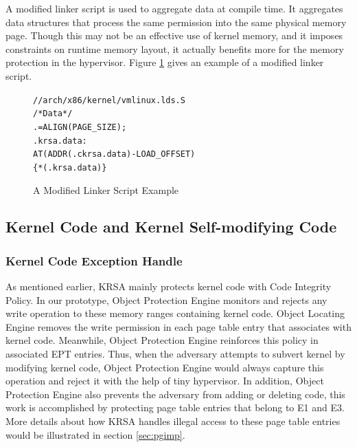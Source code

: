 \documentclass[conference]{IEEEtran}
\begin{document}
A modified linker script is used to aggregate data at compile time. It aggregates data structures that process the same permission into the same physical memory page. Though this may not be an effective use of kernel memory, and it imposes constraints on runtime memory layout, it actually benefits more for the memory protection in the hypervisor. Figure \ref{linkerexample} gives an example of a modified linker script. 
\begin{figure}[ht]
    \centering
    \begin{alltt}
    {// arch/x86/kernel/vmlinux.lds.S
    /* Data */
    . = ALIGN(PAGE_SIZE);
    .krsa.data : 
    AT(ADDR(.ckrsa.data) - LOAD_OFFSET)
    \{ *(.krsa.data) \} } \end{alltt}
\setlength{\abovecaptionskip}{0pt}
\setlength{\belowcaptionskip}{0pt}
\caption{A Modified Linker Script Example}
\label{linkerexample}
\end{figure}


\subsection{Kernel Code and Kernel Self-modifying Code} \label{sec:codeimp}

\subsubsection{Kernel Code Exception Handle} \label{sec:subcodeimp}
As mentioned earlier, KRSA mainly protects kernel code with Code Integrity Policy. In our prototype, Object Protection Engine monitors and rejects any write operation to these memory ranges containing kernel code. Object Locating Engine removes the write permission in each page table entry that associates with kernel code. Meanwhile,  Object Protection Engine reinforces this policy in associated EPT entries. Thus, when the adversary attempts to subvert kernel by modifying kernel code, Object Protection Engine would always capture this operation and reject it with the help of tiny hypervisor. 
In addition, Object Protection Engine also prevents the adversary from adding or deleting code, this work is accomplished by protecting page table entries that belong to E1 and E3. More details about how KRSA handles illegal access to these page table entries would be illustrated in section \ref{sec:pgimp}. 
\end{document}
